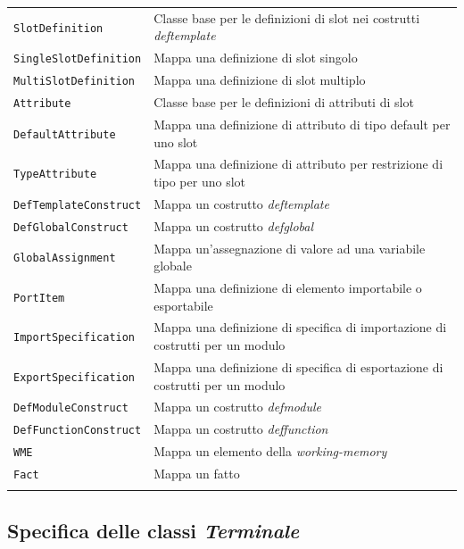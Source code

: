 \begin{longtable}{p{5.5cm}p{6.5cm}}
	\hdashline[1pt/5pt]
		\texttt{SlotDefinition} & Classe base per le definizioni di slot nei costrutti \emph{deftemplate}\\ 
	\hdashline[1pt/5pt]
		\texttt{SingleSlotDefinition} & Mappa una definizione di slot singolo\\ 
	\hdashline[1pt/5pt]
		\texttt{MultiSlotDefinition} & Mappa una definizione di slot multiplo\\ 
	\hdashline[1pt/5pt]
		\texttt{Attribute} & Classe base per le definizioni di attributi di slot\\ 
	\hdashline[1pt/5pt]
		\texttt{DefaultAttribute} & Mappa una definizione di attributo di tipo default per uno slot\\ 
	\hdashline[1pt/5pt]
		\texttt{TypeAttribute} & Mappa una definizione di attributo per restrizione di tipo per uno slot\\ 
	\hdashline[1pt/5pt]
		\texttt{DefTemplateConstruct} & Mappa un costrutto \emph{deftemplate}\\ 
	\hdashline[1pt/5pt]
		\texttt{DefGlobalConstruct} & Mappa un costrutto \emph{defglobal}\\ 
	\hdashline[1pt/5pt]
		\texttt{GlobalAssignment} & Mappa un'assegnazione di valore ad una variabile globale\\ 
	\hdashline[1pt/5pt]
		\texttt{PortItem} & Mappa una definizione di elemento importabile o esportabile\\ 
	\hdashline[1pt/5pt]
		\texttt{ImportSpecification} & Mappa una definizione di specifica di importazione di costrutti per un modulo\\ 
	\hdashline[1pt/5pt]
		\texttt{ExportSpecification} & Mappa una definizione di specifica di esportazione di costrutti per un modulo\\ 
	\hdashline[1pt/5pt]
		\texttt{DefModuleConstruct} & Mappa un costrutto \emph{defmodule}\\ 
	\hdashline[1pt/5pt]
		\texttt{DefFunctionConstruct} & Mappa un costrutto \emph{deffunction}\\ 
	\hdashline[1pt/5pt]
		\texttt{WME} & Mappa un elemento della \emph{working-memory}\\ 
	\hdashline[1pt/5pt]
		\texttt{Fact} & Mappa un fatto\\ 
	\hline\\	

\end{longtable}


\subsection{Specifica delle classi \emph{Terminale}}

